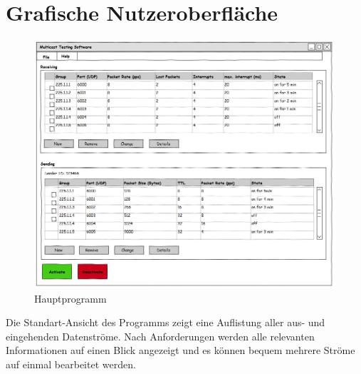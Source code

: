 \chapter{Grafische Nutzeroberfläche}
\label{a:gui}


\begin{figure}[H]
\centering
\includegraphics[scale=0.5]{images/gui/main.png}
\caption{Hauptprogramm}
\end{figure}
Die Standart-Ansicht des Programms zeigt eine Auflistung aller aus- und
eingehenden Datenströme. Nach Anforderungen werden alle relevanten
Informationen auf einen Blick angezeigt und es können bequem mehrere Ströme auf
einmal bearbeitet werden.

